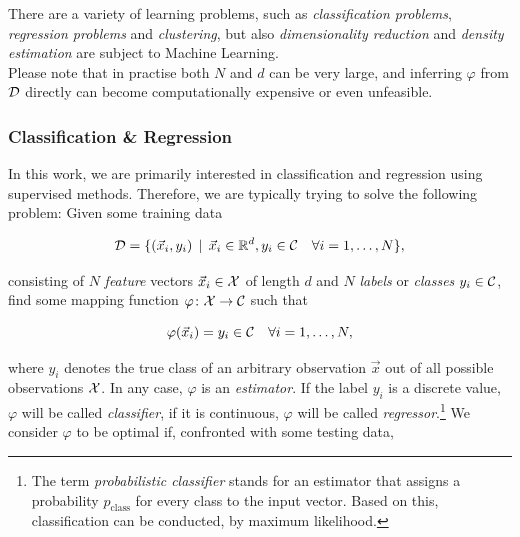 There are a variety of learning problems, such as \emph{classification problems}, \emph{regression problems} and \emph{clustering}, but also \emph{dimensionality reduction} and \emph{density estimation} are subject to Machine Learning.\\


Please note that in practise both $N$ and $d$ can be very large, and inferring $\varphi$ from $\mathcal{D}$ directly can become computationally expensive or even unfeasible.

\subsubsection{Classification \& Regression}

In this work, we are primarily interested in classification and regression using supervised methods. Therefore, we are typically trying to solve the following problem: Given some training data

\begin{equation}
\mathcal{D} = \{ (\vec x_i, y_i) \, \mid \, \vec x_i \in \mathbb{R}^d, y_i \in \mathcal{C} \quad \forall i = 1,\ldots,N \},
\end{equation}

consisting of $N$ \emph{feature} vectors $\vec x_i \in \mathcal{X}$ of length $d$ and $N$ \emph{labels} or \emph{classes} $y_i \in \mathcal{C}$, find some mapping function $\varphi \colon \mathcal{X} \to \mathcal{C}$ such that

\begin{equation}
\varphi(\vec x_i) = y_i \in \mathcal{C} \quad \forall i = 1,\ldots,N,
\end{equation}

where $y_i$ denotes the true class of an arbitrary observation $\vec x$ out of all possible observations $\mathcal{X}$. In any case, $\varphi$ is an \emph{estimator}. If the label $y_i$ is a discrete value, $\varphi$ will be called \emph{classifier}, if it is continuous, $\varphi$ will be called \emph{regressor}.\footnote{The term \emph{probabilistic classifier} stands for an estimator that assigns a probability $p_{\text{class}}$ for every class to the input vector. Based on this, classification can be conducted, \eg by maximum likelihood.} We consider $\varphi$ to be optimal if, confronted with some testing data,

